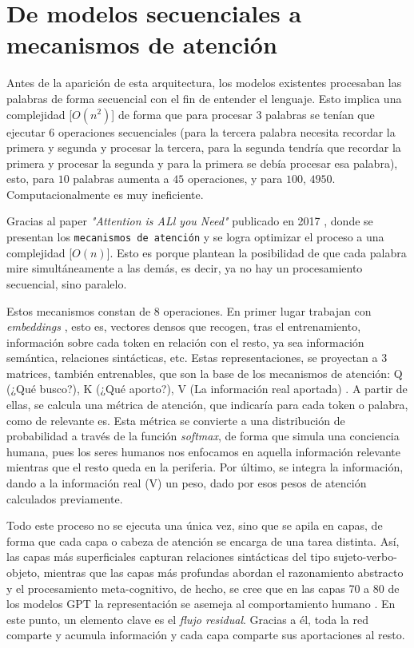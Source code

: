 \documentclass[11pt]{book}
\begin{document}
\section{De modelos secuenciales a mecanismos de atención}
Antes de la aparición de esta arquitectura, los modelos existentes procesaban las palabras de forma secuencial con el fin de entender el lenguaje. Esto implica una complejidad [$O(n^2)$] de forma que para procesar 3 palabras se tenían que ejecutar 6 operaciones secuenciales (para la tercera palabra necesita recordar la primera y segunda y procesar la tercera, para la segunda tendría que recordar la primera y procesar la segunda y para la primera se debía procesar esa palabra), esto, para $10$ palabras aumenta a $45$ operaciones, y para $100$, $4950$. Computacionalmente es muy ineficiente. 

Gracias al paper \textit{"Attention is ALl you Need"} publicado en 2017 \parencite{vaswani2017attention}, donde se presentan los \texttt{mecanismos de atención} y se logra optimizar el proceso a una complejidad [$O(n)$]. Esto es porque plantean la posibilidad de que cada palabra mire simultáneamente a las demás, es decir, ya no hay un procesamiento secuencial, sino paralelo. 

Estos mecanismos constan de 8 operaciones. En primer lugar trabajan con \textit{embeddings} \parencite{neuraforge2023guide}, esto es, vectores densos que recogen, tras el entrenamiento, información sobre cada token en relación con el resto, ya sea información semántica, relaciones sintácticas, etc. Estas representaciones, se proyectan a 3 matrices, también entrenables, que son la base de los mecanismos de atención: Q (¿Qué busco?), K (¿Qué aporto?), V (La información real aportada) \parencite{epichka2023qkv}. A partir de ellas, se calcula una métrica de atención, que indicaría para cada token o palabra, como de relevante es. Esta métrica se convierte a una distribución de probabilidad a través de la función \textit{softmax}, de forma que simula una conciencia humana, pues los seres humanos nos enfocamos en aquella información relevante mientras que el resto queda en la periferia. Por último, se integra la información, dando a la información real (V) un peso, dado por esos pesos de atención calculados previamente.

Todo este proceso no se ejecuta una única vez, sino que se apila en capas, de forma que cada capa o cabeza de atención se encarga de una tarea distinta. Así, las capas más superficiales capturan relaciones sintácticas del tipo sujeto-verbo-objeto, mientras que las capas más profundas abordan el razonamiento abstracto y el procesamiento meta-cognitivo, de hecho, se cree que en las capas 70 a 80 de los modelos GPT la representación se asemeja al comportamiento humano \parencite{plainenglish2021gpt}. En este punto, un elemento clave es el \textit{flujo residual}. Gracias a él, toda la red comparte y acumula información y cada capa comparte sus aportaciones al resto. 
\end{document}

